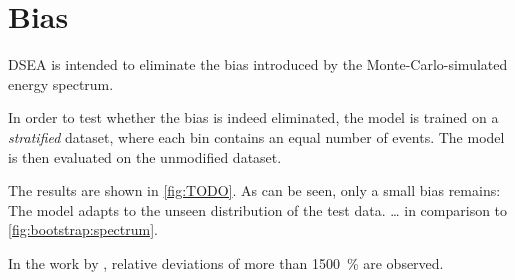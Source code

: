\section{Bias}
DSEA is intended to eliminate the bias introduced by the Monte-Carlo-simulated energy spectrum.

In order to test
whether the bias is indeed eliminated,
the model is trained on a \emph{stratified} dataset,
where each bin contains an equal number of events.
The model is then evaluated on the unmodified dataset.

The results are shown in \autoref{fig:TODO}.
As can be seen,
only a small bias remains:
The model adapts to the unseen distribution of the test data.
… in comparison to \autoref{fig:bootstrap:spectrum}.

In the work by \citeauthor{dsea_samuel},
relative deviations of more than \SI{1500}{\percent} are observed.
